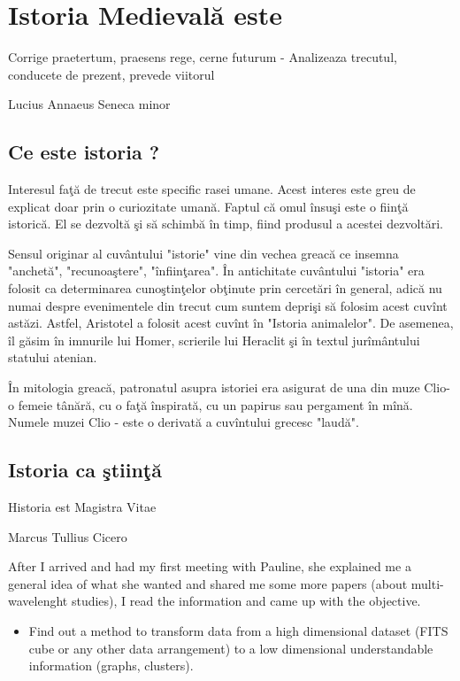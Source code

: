 
\chapter{Istoria Medievală este}
\epigraph{Corrige praetertum, praesens rege, cerne futurum - Analizeaza trecutul, conducete de prezent, prevede viitorul }{Lucius Annaeus Seneca minor}
\section{Ce este istoria ?}

Interesul faţă de trecut este specific rasei umane. Acest interes este greu de explicat doar prin o curiozitate umană. Faptul că omul însuşi  este o fiinţă istorică.  El se dezvoltă şi să schimbă în timp, fiind produsul a acestei dezvoltări.

Sensul originar al cuvântului "istorie" vine din vechea  greacă  ce insemna "anchetă", "recunoaştere", "înfiinţarea". În antichitate cuvântului "istoria" era folosit ca determinarea cunoştinţelor obţinute prin cercetări în general, adică nu numai despre evenimentele din trecut cum suntem deprişi să folosim acest cuvînt astăzi. Astfel, Aristotel a folosit acest cuvînt în "Istoria animalelor". De asemenea, îl găsim în imnurile lui Homer, scrierile lui Heraclit şi în textul jurîmântului statului atenian.



În mitologia greacă, patronatul asupra istoriei era asigurat de una din muze Clio- o femeie tânără, cu o faţă înspirată, cu un papirus sau pergament în mînă. Numele  muzei Clio - este o derivată  a cuvîntului  grecesc "laudă".



\section{Istoria ca ştiinţă}
\epigraph{Historia est Magistra Vitae}{Marcus Tullius Cicero}
After I arrived and had my first meeting with Pauline, she explained me a general idea of what she wanted and shared me some more papers (about multi-wavelenght studies), I read the information and came up with the objective.

\begin{itemize}
\item Find out a method to transform data from a high dimensional dataset (FITS cube or any other data arrangement) to a low dimensional understandable information (graphs, clusters).
\end{itemize}

